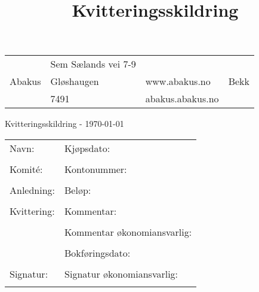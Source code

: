 \documentclass{scrartcl}
\title{Kvitteringsskildring}
\author{
}
\begin{document}
\begin{tabularx}{\textwidth}{XXXX}
 & Sem Sælands vei 7-9 &  &  \\
Abakus & Gløshaugen & www.abakus.no & Bekk \\
 & 7491 & abakus.abakus.no &  \\
\end{tabularx}


{\huge Kvitteringsskildring - \today}

\begin{tabularx}{\textwidth}{|X|X|}
\cline{1-2}
Navn: & Kjøpsdato: \\
& 
\\ \cline{1-2}
Komité: & Kontonummer: \\
& 
\\ \cline{1-2}
Anledning: & Beløp: \\
& 
\\ \cline{1-2}
Kvittering: & Kommentar: \\
 & %
 \\ \cline{2-2}
 & Kommentar økonomiansvarlig: \\
 & %
 \\ \cline{2-2}
 & Bokføringsdato: \\
 & %
 \\ \cline{1-2}
Signatur: & Signatur økonomiansvarlig: \\
& 
\\ \cline{1-2}
\end{tabularx}



\end{document}
